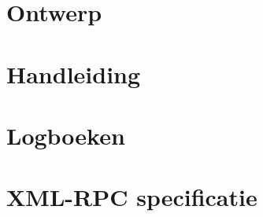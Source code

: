 \documentclass[a4paper,oneside,final]{memoir}
\begin{document}
\chapter{Ontwerp}
\label{chap:ontwerp}


\chapter{Handleiding}
\label{chap:installatie}


\chapter{Logboeken}
\label{chap:logboeken}


\chapter{XML-RPC specificatie}
\label{chap:xmlrpc}

\end{document}
